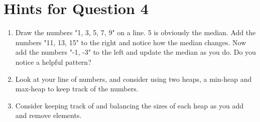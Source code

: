 \documentclass{tufte-handout}
\begin{document}
\section{\textbf{Hints for Question 4}}
\begin{enumerate}
    \item Draw the numbers "1, 3, 5, 7, 9" on a line. 5 is obviously the median. Add the numbers "11, 13, 15" to the right and notice how the median changes. Now add the numbers "-1, -3" to the left and update the median as you do. Do you notice a helpful pattern?
    \item Look at your line of numbers, and consider using two heaps, a min-heap and max-heap to keep track of the numbers.
    \item Consider keeping track of and balancing the sizes of each heap as you add and remove elements.
\end{enumerate}
\end{document}
